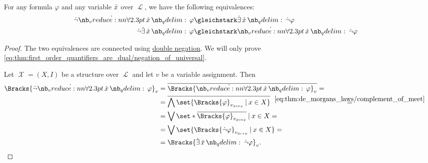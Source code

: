 \begin{proposition}\label{thm:first_order_quantifiers_are_dual}
  For any formula \( \varphi \) and any variable \( {\dot{x}} \) over \( \mscrL \), we have the following equivalences:
  \begin{align}
    \synneg \qforall \synx \varphi &\gleichstark \qexists \synx \synneg \varphi \label{eq:thm:first_order_quantifiers_are_dual/negation_of_universal} \\
    \synneg \qexists \synx \varphi &\gleichstark \qforall \synx \synneg \varphi \label{eq:thm:first_order_quantifiers_are_dual/negation_of_existential}
  \end{align}
\end{proposition}
\begin{proof}
  The two equivalences are connected using \hyperref[thm:classical_equivalences/double_negation]{double negation}. We will only prove \eqref{eq:thm:first_order_quantifiers_are_dual/negation_of_universal}.

  Let \( \mscrX = (X, I) \) be a structure over \( \mscrL \) and let \( v \) be a variable assignment. Then
  \begin{align*}
    \Bracks{ \synneg \qforall \synx \varphi }_v
    &=
    \oline{\Bracks{ \qforall \synx \varphi }_v}
    = \\ &=
    \oline{\bigwedge\set{ \Bracks{\varphi}_{v_{\synx \mapsto x}} \given x \in X }}
    \reloset {\eqref{eq:thm:de_morgans_laws/complement_of_meet}} = \\ &=
    \bigvee\set*{ \oline{\Bracks{\varphi}_{v_{\synx \mapsto x}}} \given x \in X }
    = \\ &=
    \bigvee\set{ \Bracks{\synneg \varphi}_{v_{\synx \mapsto x}} \given x \in X }
    = \\ &=
    \Bracks{\qexists \synx \synneg \varphi}_v.
  \end{align*}
\end{proof}

